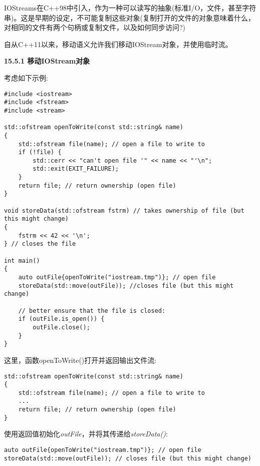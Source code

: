 IOStreams在C++98中引入，作为一种可以读写的抽象(标准I/O，文件，甚至字符串)。这是早期的设定，不可能复制这些对象(复制打开的文件的对象意味着什么，对相同的文件有两个句柄或复制文件，以及如何同步访问?)\par

自从C++11以来，移动语义允许我们移动IOStream对象，并使用临时流。\par

\hspace*{\fill} \par %
\textbf{15.5.1 移动IOStream对象}

考虑如下示例:\par

{\color{red}{lib/outfile.cpp}}\par

\begin{lstlisting}[caption={}]
#include <iostream>
#include <fstream>
#include <stream>

std::ofstream openToWrite(const std::string& name)
{
	std::ofstream file(name); // open a file to write to
	if (!file) {
		std::cerr << "can't open file '" << name << "'\n";
		std::exit(EXIT_FAILURE);
	}
	return file; // return ownership (open file)
}

void storeData(std::ofstream fstrm) // takes ownership of file (but this might change)
{
	fstrm << 42 << '\n';
} // closes the file

int main()
{
	auto outFile{openToWrite("iostream.tmp")}; // open file
	storeData(std::move(outFile)); //closes file (but this might change)
	
	// better ensure that the file is closed:
	if (outFile.is_open()) {
		outFile.close();
	}
}
\end{lstlisting}

这里，函数openToWrite()打开并返回输出文件流:\par

\begin{lstlisting}[caption={}]
std::ofstream openToWrite(const std::string& name)
{
	std::ofstream file(name); // open a file to write to
	...
	return file; // return ownership (open file)
}
\end{lstlisting}

使用返回值初始化\textit{outFile}，并将其传递给\textit{storeData()}:\par

\begin{lstlisting}[caption={}]
auto outFile{openToWrite("iostream.tmp")}; // open file
storeData(std::move(outFile)); // closes file (but this might change)
\end{lstlisting}

